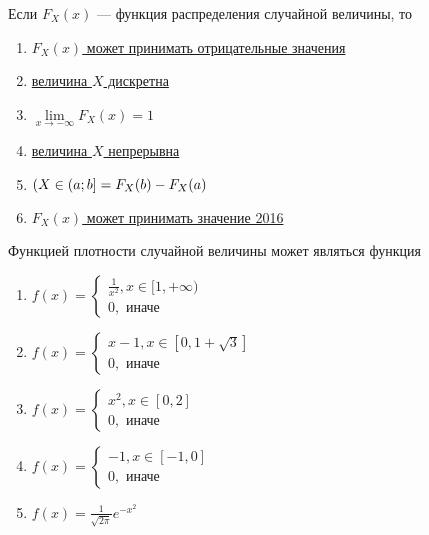 \documentclass[t]{beamer}
\let\P\relax
\DeclareMathOperator{\P}{\mathbb{P}}
\begin{document}
 \begin{frame} \label{9} 
\begin{block}{9} 

  Если $F_X(x)$ — функция распределения случайной величины, то
  


 \end{block} 
\begin{enumerate} 
\item[] \hyperlink{9-No}{\beamergotobutton{} $F_X(x)$ может принимать отрицательные значения}
\item[] \hyperlink{9-No}{\beamergotobutton{} величина $X$ дискретна}
\item[] \hyperlink{9-No}{\beamergotobutton{} $\lim\limits_{x \rightarrow -\infty} F_X(x) = 1 $}
\item[] \hyperlink{9-No}{\beamergotobutton{} величина $X$ непрерывна}
\item[] \hyperlink{9-Yes}{\beamergotobutton{}  $\P(X \in (a;b] = F_X(b) - F_X(a)$}
\item[] \hyperlink{9-No}{\beamergotobutton{} $F_X(x)$ может принимать значение 2016}
\end{enumerate} 
\end{frame} 


 \begin{frame} \label{10} 
\begin{block}{10} 

Функцией плотности случайной величины может являться функция
  


 \end{block} 
\begin{enumerate} 
\item[] \hyperlink{10-Yes}{\beamergotobutton{} $f(x) = \begin{cases}
	\frac{1}{x^2}, x \in [1,+ \infty) \\
	0,\text{ иначе}
	\end{cases}$}
\item[] \hyperlink{10-No}{\beamergotobutton{} $ f(x) = \begin{cases}
	x - 1, x \in [0,1+\sqrt{3}] \\
	0,\text{ иначе}
	\end{cases}$}
\item[] \hyperlink{10-No}{\beamergotobutton{} $ f(x) = \begin{cases}
	x^2, x \in [0,2] \\
	0,\text{ иначе}
	\end{cases}$}
\item[] \hyperlink{10-No}{\beamergotobutton{} $ f(x) = \begin{cases}
	-1, x \in [-1, 0] \\
	0,\text{ иначе}
	\end{cases}$}
\item[] \hyperlink{10-No}{\beamergotobutton{} $ f(x) = \frac{1}{\sqrt{2\pi}} e^{-x^2}$}
\end{enumerate} 
\end{frame} 
\end{document}
